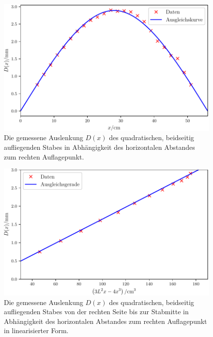 \begin{figure}
	\centering
	\includegraphics[width=\linewidth-70pt,height=\textheight-70pt,keepaspectratio]{content/images/StabQuadratBeidseitig1.pdf}
	\caption{Die gemessene Auslenkung $D(x)$ des quadratischen, beidseitig aufliegenden Stabes in Abhängigkeit des horizontalen Abstandes zum rechten Auflagepunkt.}
	\label{fig:beidseitig}
\end{figure}
\begin{figure}
	\centering
	\includegraphics[width=\linewidth-70pt,height=\textheight-70pt,keepaspectratio]{content/images/StabQuadratBeidseitig2.pdf}
	\caption{Die gemessene Auslenkung $D(x)$ des quadratischen, beidseitig aufliegenden Stabes von der rechten Seite bis zur Stabmitte in Abhängigkeit des horizontalen Abstandes zum rechten Auflagepunkt in linearisierter Form.}
	\label{fig:beidseitiglinear1}
\end{figure}
